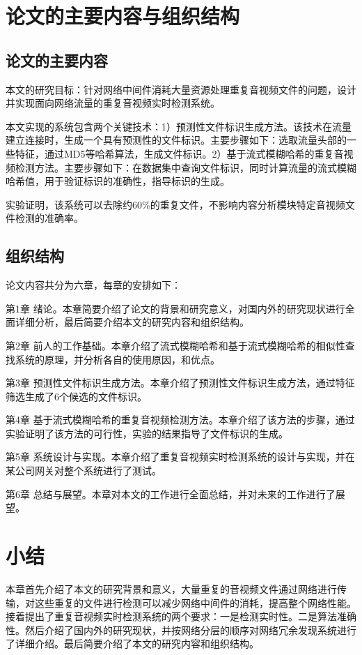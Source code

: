 \section{论文的主要内容与组织结构}
\subsection{论文的主要内容}
本文的研究目标：针对网络中间件消耗大量资源处理重复音视频文件的问题，设计并实现面向网络流量的重复音视频实时检测系统。

本文实现的系统包含两个关键技术：1）预测性文件标识生成方法。该技术在流量建立连接时，生成一个具有预测性的文件标识。主要步骤如下：选取流量头部的一些特征，通过MD5等哈希算法，生成文件标识。2）基于流式模糊哈希的重复音视频检测方法。主要步骤如下：在数据集中查询文件标识，同时计算流量的流式模糊哈希值，用于验证标识的准确性，指导标识的生成。

实验证明，该系统可以去除约60\%的重复文件，不影响内容分析模块特定音视频文件检测的准确率。
\subsection{组织结构}
论文内容共分为六章，每章的安排如下：

第1章 绪论。本章简要介绍了论文的背景和研究意义，对国内外的研究现状进行全面详细分析，最后简要介绍本文的研究内容和组织结构。

第2章 前人的工作基础。本章介绍了流式模糊哈希和基于流式模糊哈希的相似性查找系统的原理，并分析各自的使用原因，和优点。

第3章 预测性文件标识生成方法。本章介绍了预测性文件标识生成方法，通过特征筛选生成了6个候选的文件标识。

第4章 基于流式模糊哈希的重复音视频检测方法。本章介绍了该方法的步骤，通过实验证明了该方法的可行性，实验的结果指导了文件标识的生成。

第5章 系统设计与实现。本章介绍了重复音视频实时检测系统的设计与实现，并在某公司网关对整个系统进行了测试。

第6章 总结与展望。本章对本文的工作进行全面总结，并对未来的工作进行了展望。

\section{小结}
本章首先介绍了本文的研究背景和意义，大量重复的音视频文件通过网络进行传输，对这些重复的文件进行检测可以减少网络中间件的消耗，提高整个网络性能。接着提出了重复音视频实时检测系统的两个要求：一是检测实时性。二是算法准确性。然后介绍了国内外的研究现状，并按网络分层的顺序对网络冗余发现系统进行了详细介绍。最后简要介绍了本文的研究内容和组织结构。